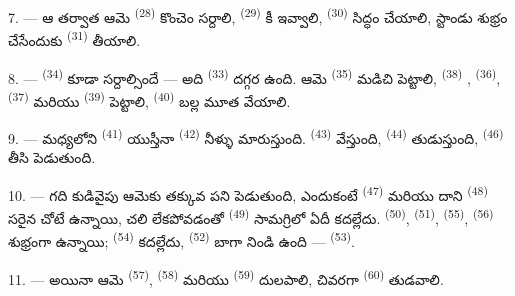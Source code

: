 7. --- ఆ తర్వాత ఆమె  \textsuperscript{(28)} కొంచెం సర్దాలి,
 \textsuperscript{(29)} కీ ఇవ్వాలి, 
\textsuperscript{(30)} సిద్ధం చేయాలి, స్టాండు శుభ్రం చేసేందుకు 
\textsuperscript{(31)} తీయాలి.

\VUsaut{5.0mm}
\VUsaut{3.0mm}

8. ---  \textsuperscript{(34)} కూడా సర్దాల్సిందే — అది 
\textsuperscript{(33)} దగ్గర ఉంది. ఆమె  \textsuperscript{(35)} మడిచి
పెట్టాలి,  \textsuperscript{(38)} , 
\textsuperscript{(36)},  \textsuperscript{(37)} మరియు 
\textsuperscript{(39)} పెట్టాలి,  \textsuperscript{(40)} బల్ల మూత వేయాలి.

9. --- మధ్యలోని  \textsuperscript{(41)} యుస్తీనా
 \textsuperscript{(42)} నీళ్ళు మారుస్తుంది. 
\textsuperscript{(43)}  వేస్తుంది, 
\textsuperscript{(44)} తుడుస్తుంది,  \textsuperscript{(46)} తీసి
పెడుతుంది.

10. --- గది కుడివైపు ఆమెకు తక్కువ పని పెడుతుంది, ఎందుకంటే 
\textsuperscript{(47)} మరియు దాని  \textsuperscript{(48)} సరైన చోటే ఉన్నాయి, చలి
లేకపోవడంతో  \textsuperscript{(49)} సామగ్రిలో ఏదీ కదల్లేదు. 
\textsuperscript{(50)},  \textsuperscript{(51)},
 \textsuperscript{(55)}, 
\textsuperscript{(56)} శుభ్రంగా ఉన్నాయి;  \textsuperscript{(54)} కదల్లేదు,
 \textsuperscript{(52)} బాగా నిండి ఉంది — 
\textsuperscript{(53)}.



11. --- అయినా ఆమె  \textsuperscript{(57)}, 
\textsuperscript{(58)} మరియు  \textsuperscript{(59)} దులపాలి,
చివరగా  \textsuperscript{(60)} తుడవాలి.

